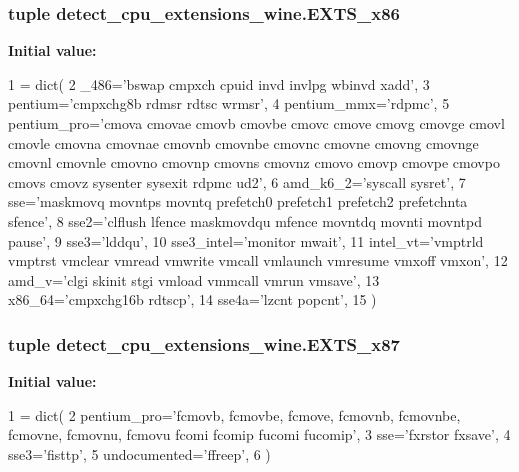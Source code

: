 \subsubsection[{E\+X\+T\+S\+\_\+x86}]{\setlength{\rightskip}{0pt plus 5cm}tuple detect\+\_\+cpu\+\_\+extensions\+\_\+wine.\+E\+X\+T\+S\+\_\+x86}\label{namespacedetect__cpu__extensions__wine_a445913570ab2aa910316aa03d9dac2a6}
{\bfseries Initial value\+:}
\begin{DoxyCode}
1 = dict(
2     \_486=\textcolor{stringliteral}{'bswap cmpxch cpuid invd invlpg wbinvd xadd'},
3     pentium=\textcolor{stringliteral}{'cmpxchg8b rdmsr rdtsc wrmsr'},
4     pentium\_mmx=\textcolor{stringliteral}{'rdpmc'},
5     pentium\_pro=\textcolor{stringliteral}{'cmova cmovae cmovb cmovbe cmovc cmove cmovg cmovge cmovl cmovle cmovna cmovnae cmovnb
       cmovnbe cmovnc cmovne cmovng cmovnge cmovnl cmovnle cmovno cmovnp cmovns cmovnz cmovo cmovp cmovpe cmovpo cmovs
       cmovz sysenter sysexit rdpmc ud2'},
6     amd\_k6\_2=\textcolor{stringliteral}{'syscall sysret'},
7     sse=\textcolor{stringliteral}{'maskmovq movntps movntq prefetch0 prefetch1 prefetch2 prefetchnta sfence'},
8     sse2=\textcolor{stringliteral}{'clflush lfence maskmovdqu mfence movntdq movnti movntpd pause'},
9     sse3=\textcolor{stringliteral}{'lddqu'},
10     sse3\_intel=\textcolor{stringliteral}{'monitor mwait'},
11     intel\_vt=\textcolor{stringliteral}{'vmptrld vmptrst vmclear vmread vmwrite vmcall vmlaunch vmresume vmxoff vmxon'},
12     amd\_v=\textcolor{stringliteral}{'clgi skinit stgi vmload vmmcall vmrun vmsave'},
13     x86\_64=\textcolor{stringliteral}{'cmpxchg16b rdtscp'},
14     sse4a=\textcolor{stringliteral}{'lzcnt popcnt'},
15 )
\end{DoxyCode}
\hypertarget{namespacedetect__cpu__extensions__wine_ab3b5277a59d4cbbc4963658748d1dc3a}{}
\subsubsection[{E\+X\+T\+S\+\_\+x87}]{\setlength{\rightskip}{0pt plus 5cm}tuple detect\+\_\+cpu\+\_\+extensions\+\_\+wine.\+E\+X\+T\+S\+\_\+x87}\label{namespacedetect__cpu__extensions__wine_ab3b5277a59d4cbbc4963658748d1dc3a}
{\bfseries Initial value\+:}
\begin{DoxyCode}
1 = dict(
2     pentium\_pro=\textcolor{stringliteral}{'fcmovb, fcmovbe, fcmove, fcmovnb, fcmovnbe, fcmovne, fcmovnu, fcmovu fcomi fcomip fucomi
       fucomip'},
3     sse=\textcolor{stringliteral}{'fxrstor fxsave'},
4     sse3=\textcolor{stringliteral}{'fisttp'},
5     undocumented=\textcolor{stringliteral}{'ffreep'},
6 )
\end{DoxyCode}
\hypertarget{namespacedetect__cpu__extensions__wine_a16a7a3a258ead9efca6e313ba354f982}{}
